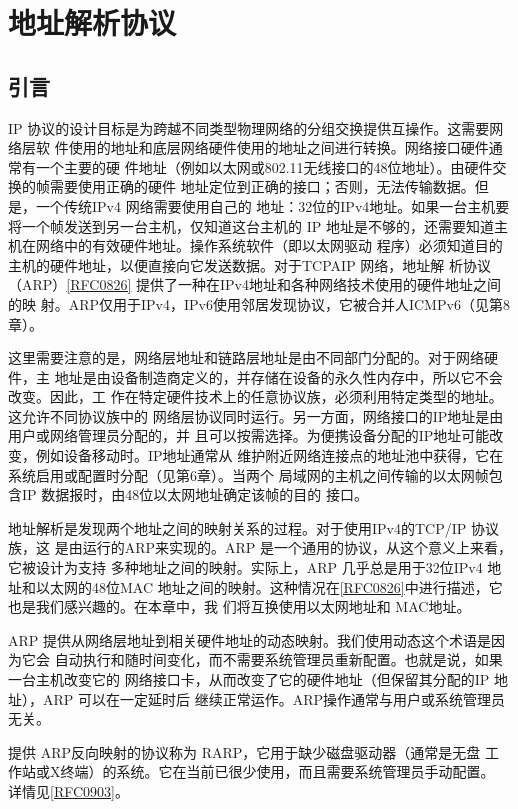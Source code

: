 \chapter{地址解析协议}

\section{引言}

IP 协议的设计目标是为跨越不同类型物理网络的分组交换提供互操作。这需要网络层软
件使用的地址和底层网络硬件使用的地址之间进行转换。网络接口硬件通常有一个主要的硬
件地址（例如以太网或802.11无线接口的48位地址）。由硬件交换的帧需要使用正确的硬件
地址定位到正确的接口；否则，无法传输数据。但是，一个传统IPv4 网络需要使用自己的
地址：32位的IPv4地址。如果一台主机要将一个帧发送到另一台主机，仅知道这台主机的
IP 地址是不够的，还需要知道主机在网络中的有效硬件地址。操作系统软件（即以太网驱动
程序）必须知道目的主机的硬件地址，以便直接向它发送数据。对于TCPAIP 网络，地址解
析协议（ARP）\href{https://www.rfc-editor.org/rfc/rfc0826}{[RFC0826]}
提供了一种在IPv4地址和各种网络技术使用的硬件地址之间的映
射。ARP仅用于IPv4，IPv6使用邻居发现协议，它被合并人ICMPv6（见第8章）。

这里需要注意的是，网络层地址和链路层地址是由不同部门分配的。对于网络硬件，主
地址是由设备制造商定义的，并存储在设备的永久性内存中，所以它不会改变。因此，工
作在特定硬件技术上的任意协议族，必须利用特定类型的地址。这允许不同协议族中的
网络层协议同时运行。另一方面，网络接口的IP地址是由用户或网络管理员分配的，并
且可以按需选择。为便携设备分配的IP地址可能改变，例如设备移动时。IP地址通常从
维护附近网络连接点的地址池中获得，它在系统启用或配置时分配（见第6章）。当两个
局域网的主机之间传输的以太网帧包含IP 数据报时，由48位以太网地址确定该帧的目的
接口。

地址解析是发现两个地址之间的映射关系的过程。对于使用IPv4的TCP/IP 协议族，这
是由运行的ARP来实现的。ARP 是一个通用的协议，从这个意义上来看，它被设计为支持
多种地址之间的映射。实际上，ARP 几乎总是用于32位IPv4 地址和以太网的48位MAC
地址之间的映射。这种情况在\href{https://www.rfc-editor.org/rfc/rfc0826}{[RFC0826]}中进行描述，它也是我们感兴趣的。在本章中，我
们将互换使用以太网地址和 MAC地址。

ARP 提供从网络层地址到相关硬件地址的动态映射。我们使用动态这个术语是因为它会
自动执行和随时间变化，而不需要系统管理员重新配置。也就是说，如果一台主机改变它的
网络接口卡，从而改变了它的硬件地址（但保留其分配的IP 地址），ARP 可以在一定延时后
继续正常运作。ARP操作通常与用户或系统管理员无关。

\begin{tcolorbox}
  提供 ARP反向映射的协议称为 RARP，它用于缺少磁盘驱动器（通常是无盘
  工作站或X终端）的系统。它在当前已很少使用，而且需要系统管理员手动配置。
  详情见\href{https://www.rfc-editor.org/rfc/rfc0903}{[RFC0903]}。
\end{tcolorbox}

